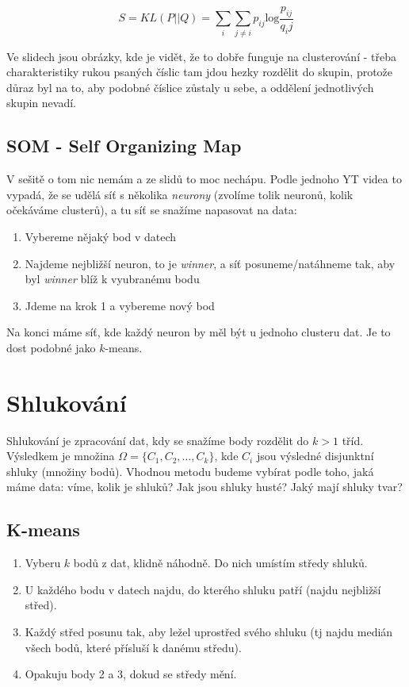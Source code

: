 \begin{equation}
S=KL(P||Q)=\sum_i\sum_{j\neq i} p_{ij}\text{log}\frac{p_{ij}}{q_ij}
\end{equation}

Ve slidech jsou obrázky, kde je vidět, že to dobře funguje na clusterování - třeba charakteristiky rukou psaných číslic tam jdou hezky rozdělit do skupin, protože důraz byl na to, aby podobné číslice zůstaly u sebe, a oddělení jednotlivých skupin nevadí.

\subsection{SOM - Self Organizing Map}
V sešitě o tom nic nemám a ze slidů to moc nechápu. Podle jednoho YT videa to vypadá, že se udělá síť s několika \textit{neurony} (zvolíme tolik neuronů, kolik očekáváme clusterů), a tu síť se snažíme napasovat na data:

\begin{enumerate}
\item Vybereme nějaký bod v datech
\item Najdeme nejbližší neuron, to je \textit{winner}, a síť posuneme/natáhneme tak, aby byl \textit{winner} blíž k vyubranému bodu
\item Jdeme na krok 1 a vybereme nový bod
\end{enumerate}

\noindent Na konci máme síť, kde každý neuron by měl být u jednoho clusteru dat. Je to dost podobné jako $k$-means.







\section{Shlukování}

Shlukování je zpracování dat, kdy se snažíme body rozdělit do $k>1$ tříd. Výsledkem je množina $\Omega = \{C_1, C_2, \dots, C_k\}$, kde $C_i$ jsou výsledné disjunktní shluky (množiny bodů). Vhodnou metodu budeme vybírat podle toho, jaká máme data: víme, kolik je shluků? Jak jsou shluky husté? Jaký mají shluky tvar?

\subsection{K-means}

\begin{enumerate}
\item Vyberu $k$ bodů z dat, klidně náhodně. Do nich umístím středy shluků.
\item U každého bodu v datech najdu, do kterého shluku patří (najdu nejbližší střed).
\item Každý střed posunu tak, aby ležel uprostřed svého shluku (tj najdu medián všech bodů, které přísluší k danému středu).
\item Opakuju body 2 a 3, dokud se středy mění.
\end{enumerate}

